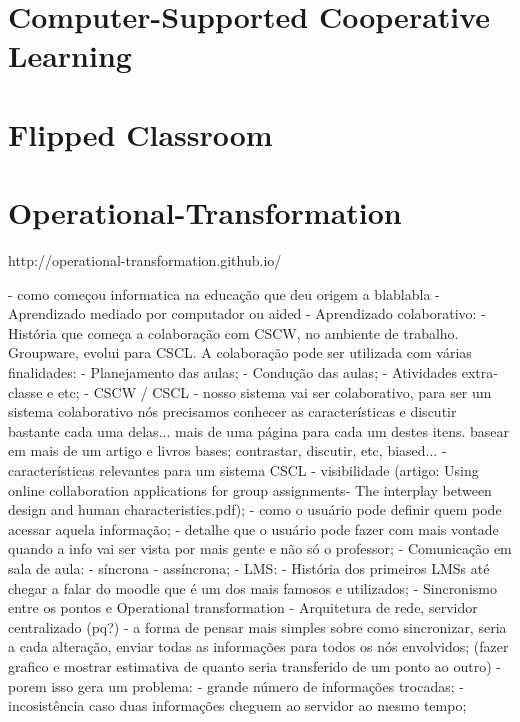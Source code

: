 \section{Computer-Supported Cooperative Learning}

\section{Flipped Classroom}

\section{Operational-Transformation}
http://operational-transformation.github.io/


            - como começou informatica na educação que deu origem a blablabla
            - Aprendizado mediado por computador ou aided
            - Aprendizado colaborativo:
                - História que começa a colaboração com CSCW, no ambiente de trabalho. Groupware, evolui para CSCL. A colaboração pode ser utilizada com várias finalidades:
                    - Planejamento das aulas;
                    - Condução das aulas;
                    - Atividades extra-classe e etc;
                - CSCW / CSCL
                    - nosso sistema vai ser colaborativo, para ser um sistema colaborativo nós precisamos conhecer as características e discutir bastante cada uma delas... mais de uma página para cada um destes itens. basear em mais de um artigo e livros bases; contrastar, discutir, etc, biased...
                    - características relevantes para um sistema CSCL
                        - visibilidade (artigo: Using online collaboration applications for group assignments- The interplay between design and human characteristics.pdf);
                    - como o usuário pode definir quem pode acessar aquela informação;
                    - detalhe que o usuário pode fazer com mais vontade quando a info vai ser vista por mais gente e não só o professor;
                        - Comunicação em sala de aula: 
                            - síncrona 
                            - assíncrona;
            - LMS:
                - História dos primeiros LMSs até chegar a falar do moodle que é um dos mais famosos e utilizados;
            - Sincronismo entre os pontos e Operational transformation
                - Arquitetura de rede, servidor centralizado (pq?)
                - a forma de pensar mais simples sobre como sincronizar, seria a cada alteração, enviar todas as informações para todos os nós envolvidos;
                (fazer grafico e mostrar estimativa de quanto seria transferido de um ponto ao outro)
                    - porem isso gera um problema: 
                        - grande número de informações trocadas;
                        - incosistência caso duas informações cheguem ao servidor ao mesmo tempo;


